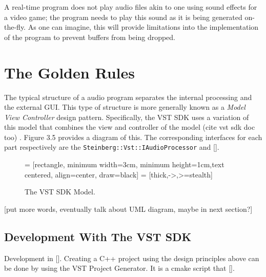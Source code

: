 A real-time program does not play audio files akin to one using sound effects for a video game; the program needs to play this sound as it is being generated on-the-fly. As one can imagine, this will provide limitations into the implementation of the program to prevent buffers from being dropped.
\pagebreak

\section{The Golden Rules}
The typical structure of a audio program separates the internal processing and the external GUI. This type of structure is more generally known as a \textit{Model View Controller} design pattern. Specifically, the VST SDK uses a variation of this model that combines the view and controller of the model (cite vst sdk doc too) \cite{Bucanek2009}. Figure 3.5 provides a diagram of this. The corresponding interfaces for each part respectively are the \verb|Steinberg::Vst::IAudioProcessor|  and [].

\begin{figure}[h] %
	 = [rectangle, minimum width=3cm, minimum height=1cm,text centered, align=center, draw=black]
	 = [thick,->,>=stealth]
	\begin{center}
		\caption{The VST SDK Model.}
	\end{center}
\end{figure}

[put more words, eventually talk about UML diagram, maybe in next section?]

\subsection{Development With The VST SDK}
Development in []. Creating a C++ project using the design principles above can be done by using the VST Project Generator. It is a cmake script that [].


